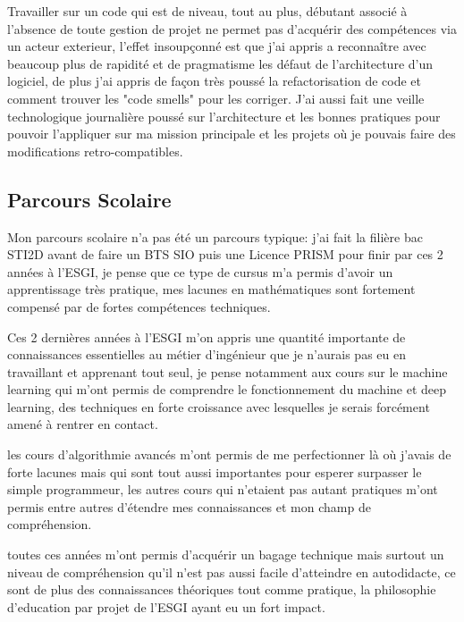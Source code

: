 Travailler sur un code qui est de niveau, tout au plus, débutant associé à l'absence de toute 
gestion de projet ne permet pas d'acquérir des compétences via un acteur exterieur, 
l'effet insoupçonné est que j'ai appris a reconnaître avec beaucoup plus de rapidité 
et de pragmatisme les défaut de l'architecture d'un logiciel, de plus j'ai appris 
de façon très poussé la refactorisation de code et comment trouver les "code smells" pour 
les corriger. J'ai aussi fait une veille technologique journalière poussé sur l'architecture 
et les bonnes pratiques pour pouvoir l'appliquer sur ma mission principale et 
les projets où je pouvais faire des modifications retro-compatibles. 


\newpage

\subsection{Parcours Scolaire}
Mon parcours scolaire n'a pas été un parcours typique: j'ai fait la filière bac STI2D avant de faire un BTS SIO
puis une Licence PRISM pour finir par ces 2 années à l'ESGI, je pense que ce type de cursus m'a permis 
d'avoir un apprentissage très pratique, mes lacunes en mathématiques sont fortement compensé par de fortes compétences 
techniques. \newline 

Ces 2 dernières années à l'ESGI m'on appris une quantité importante de connaissances essentielles au métier 
d'ingénieur que je n'aurais pas eu en travaillant et apprenant tout seul, je pense notamment aux cours sur 
le machine learning qui m'ont permis de comprendre le fonctionnement du machine et deep learning, 
des techniques en forte croissance avec lesquelles je serais forcément amené à rentrer en contact. \newline 

les cours d'algorithmie avancés m'ont permis de me perfectionner là où j'avais de forte lacunes mais 
qui sont tout aussi importantes pour esperer surpasser le simple programmeur, 
les autres cours qui n'etaient pas autant pratiques m'ont permis entre autres d'étendre mes 
connaissances et mon champ de compréhension.  \newline 

toutes ces années m'ont permis d'acquérir un bagage technique mais surtout un niveau de compréhension 
qu'il n'est pas aussi facile d'atteindre en autodidacte, ce sont de plus des connaissances théoriques tout 
comme pratique, la philosophie d'education par projet de l'ESGI ayant eu un fort impact.

